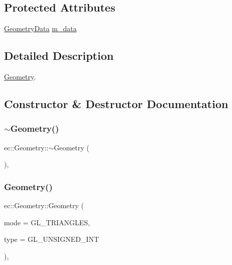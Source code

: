 \subsection*{Protected Attributes}
\begin{DoxyCompactItemize}
\item 
\mbox{\hyperlink{classec_1_1_geometry_data}{Geometry\+Data}} \mbox{\hyperlink{classec_1_1_geometry_aeb72a472b242d92496f0283cfee17fac}{m\+\_\+data}}
\end{DoxyCompactItemize}


\subsection{Detailed Description}
\mbox{\hyperlink{classec_1_1_geometry}{Geometry}}. 

\subsection{Constructor \& Destructor Documentation}
\mbox{\label{classec_1_1_geometry_a964c581313da2be51a3c78d3be7f48b3}} 
\subsubsection{\texorpdfstring{$\sim$\+Geometry()}{~Geometry()}}
{\footnotesize\ttfamily ec\+::\+Geometry\+::$\sim$\+Geometry (\begin{DoxyParamCaption}{ }\end{DoxyParamCaption})\hspace{0.3cm}{\ttfamily [virtual]}, {\ttfamily [default]}}

\mbox{\label{classec_1_1_geometry_aeae22c6b54c7c534249ee08b3fb77a70}} 
\subsubsection{\texorpdfstring{Geometry()}{Geometry()}}
{\footnotesize\ttfamily ec\+::\+Geometry\+::\+Geometry (\begin{DoxyParamCaption}\item[{G\+Lenum}]{mode = {\ttfamily GL\+\_\+TRIANGLES},  }\item[{G\+Lenum}]{type = {\ttfamily GL\+\_\+UNSIGNED\+\_\+INT} }\end{DoxyParamCaption})\hspace{0.3cm}{\ttfamily [explicit]}, {\ttfamily [protected]}}



